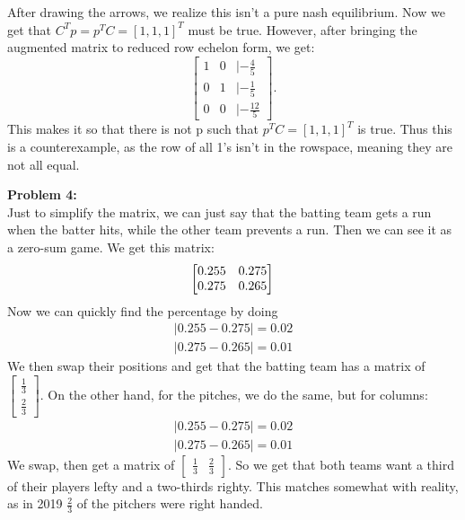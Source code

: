 \documentclass[12pt]{article}
\begin{document}
After drawing the arrows, we realize this isn't a pure nash equilibrium. Now we get that
$C^{T}p = p^{T}C = [1, 1, 1]^{T}$ must be true. However, after bringing the augmented
matrix to reduced row echelon form, we get:
\[
\begin{bmatrix}
	1 & 0 & |-\frac{4}{5} \\
	0 & 1 & |-\frac{1}{5} \\
	0 & 0 & |-\frac{12}{5}
\end{bmatrix}
.\] This makes it so that there is not p such that $p^{T}C = [1, 1, 1]^{T}$ is true. Thus
this is a counterexample, as the row of all 1's isn't in the rowspace, meaning they are not all
equal.

\noindent
 \textbf{Problem 4: } \\
Just to simplify the matrix, we can just say that the batting team gets a run when
the batter hits, while the other team prevents a run. Then we can see it as a 
zero-sum game. 
We get this matrix: \\
\[
\begin{bmatrix}
	0.255 & 0.275 \\
	0.275 & 0.265 \\
\end{bmatrix} \\
\]
\noindent
Now we can quickly find the percentage by doing
\begin{align}
	|0.255-0.275| = 0.02 \\
	|0.275-0.265| = 0.01
\end{align}
We then swap their positions and get that the batting team has a matrix of
$\begin{bmatrix}
	\frac{1}{3} \\
	\frac{2}{3}
\end{bmatrix}.$
On the other hand, for the pitches, we do the same, but for columns: 
\begin{align}
	|0.255-0.275| = 0.02 \\
	|0.275-0.265| = 0.01
\end{align}
We swap, then get a matrix of $
\begin{bmatrix}
	\frac{1}{3} & \frac{2}{3}
\end{bmatrix}.$
So we get that both teams want a third of their players lefty and a two-thirds righty.
This matches somewhat with reality, as in 2019 $\frac{2}{3}$ of the pitchers were right handed.
\end{document}

